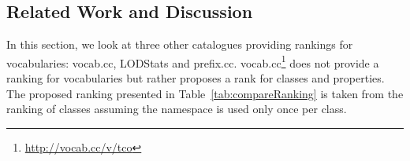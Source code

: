 \begin{description}
\subsection{Related Work and Discussion}
\label{sec:related}
In this section, we look at three other catalogues providing rankings for vocabularies: vocab.cc, LODStats and prefix.cc. vocab.cc\footnote{\url{http://vocab.cc/v/tco}} does not provide a ranking for vocabularies but rather proposes a rank for classes and properties. The proposed ranking presented in Table~\ref{tab:compareRanking} is taken from the ranking of classes assuming the namespace is used only once per class.

\begin{table}[!htbp]
\end{table}


\end{description}
